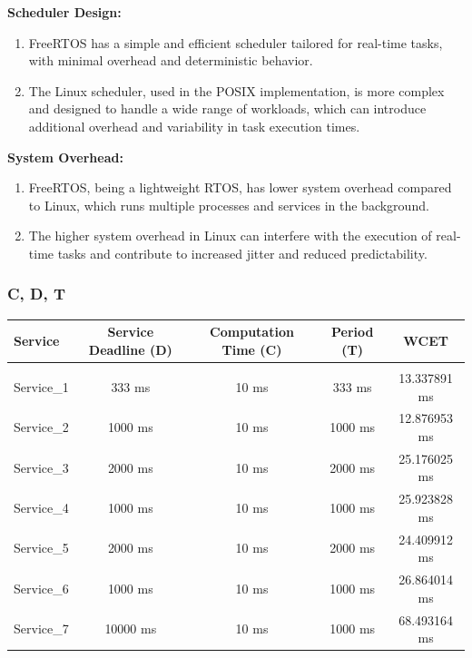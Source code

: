 \documentclass[a4paper,11pt]{article}%
\newenvironment{qanda}{\setlength{\parindent}{0pt}}{\bigskip}
\begin{document}
\begin{qanda}
\begin{enumerate}
			\textbf{Scheduler Design:}
			\begin{enumerate}
				\item FreeRTOS has a simple and efficient scheduler tailored for real-time tasks, with minimal overhead and deterministic behavior.
				\item The Linux scheduler, used in the POSIX implementation, is more complex and designed to handle a wide range of workloads, which can introduce additional overhead and variability in task execution times.
			\end{enumerate}

			\textbf{System Overhead:}
			\begin{enumerate}
				\item FreeRTOS, being a lightweight RTOS, has lower system overhead compared to Linux, which runs multiple processes and services in the background.
				\item The higher system overhead in Linux can interfere with the execution of real-time tasks and contribute to increased jitter and reduced predictability.
			\end{enumerate}

			\subsubsection{C, D, T}
			\begin{table}[H]
				\centering
				\begin{tabular}{l c c c c}
					\hline
					\textbf{Service} & \textbf{Service	Deadline (D)} & \textbf{Computation Time (C)} & \textbf{Period (T)} & \textbf{WCET} \\\hline
					                 &                              &                                                                     \\
					Service\_1       & 333 ms                      & 10 ms                         & 333 ms              & 13.337891 ms  \\
					Service\_2       & 1000 ms                       & 10 ms                         & 1000 ms             & 12.876953 ms  \\
					Service\_3       & 2000 ms                       & 10 ms                         & 2000 ms             & 25.176025 ms  \\
					Service\_4       & 1000 ms                       & 10 ms                         & 1000 ms             & 25.923828 ms  \\
					Service\_5       & 2000 ms                       & 10 ms                         & 2000 ms             & 24.409912 ms  \\
					Service\_6       & 1000 ms                       & 10 ms                         & 1000 ms             & 26.864014 ms  \\
					Service\_7       & 10000 ms                      & 10 ms                         & 1000 ms             & 68.493164 ms  \\


\end{tabular}
\end{table}
\end{enumerate}
\end{qanda}
\end{document}
